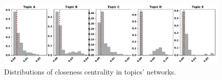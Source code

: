 \documentclass{article}
\theoremstyle{definition}
\begin{document}
\begin{figure}[!hbtp]
    \centering
    \includegraphics[width=\textwidth]{./assets/images/topics_closeness_distributions.pdf}
    \caption{Distributions of closeness centrality in topics' networks.}
    \label{fig:cc_distributions_topics}
\end{figure}
\end{document}
